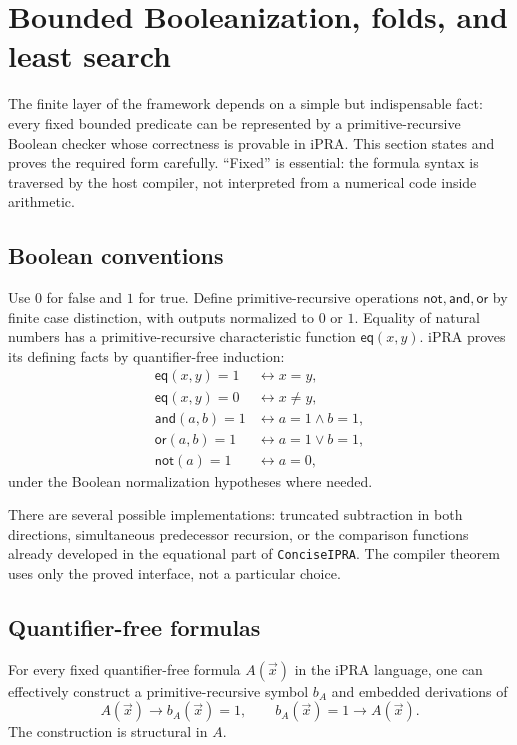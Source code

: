 \section{Bounded Booleanization, folds, and least search}
\label{sec:booleanization}

The finite layer of the framework depends on a simple but indispensable fact:
every fixed bounded predicate can be represented by a primitive-recursive
Boolean checker whose correctness is provable in iPRA.  This section states
and proves the required form carefully.  ``Fixed'' is essential: the formula
syntax is traversed by the host compiler, not interpreted from a numerical
code inside arithmetic.

\subsection{Boolean conventions}

Use \(0\) for false and \(1\) for true.  Define primitive-recursive operations
\(\mathsf{not},\mathsf{and},\mathsf{or}\) by finite case distinction, with
outputs normalized to \(0\) or \(1\).  Equality of natural numbers has a
primitive-recursive characteristic function \(\mathsf{eq}(x,y)\).  iPRA proves
its defining facts by quantifier-free induction:
\begin{align*}
 \mathsf{eq}(x,y)=1 &\leftrightarrow x=y,\\
 \mathsf{eq}(x,y)=0 &\leftrightarrow x\neq y,\\
 \mathsf{and}(a,b)=1 &\leftrightarrow a=1\wedge b=1,\\
 \mathsf{or}(a,b)=1 &\leftrightarrow a=1\vee b=1,\\
 \mathsf{not}(a)=1 &\leftrightarrow a=0,
\end{align*}
under the Boolean normalization hypotheses where needed.

There are several possible implementations: truncated subtraction in both
directions, simultaneous predecessor recursion, or the comparison functions
already developed in the equational part of \texttt{ConciseIPRA}.  The
compiler theorem uses only the proved interface, not a particular choice.

\subsection{Quantifier-free formulas}

\begin{theorem}
\label{thm:qf-booleanization}
For every fixed quantifier-free formula \(A(\vec x)\) in the iPRA language,
one can effectively construct a primitive-recursive symbol \(b_A\) and
embedded derivations of
\[
 A(\vec x)\longrightarrow b_A(\vec x)=1,
 \qquad
 b_A(\vec x)=1\longrightarrow A(\vec x).
\]
The construction is structural in \(A\).
\end{theorem}

